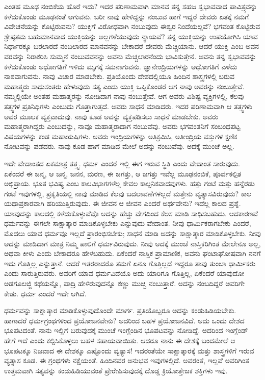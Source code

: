 ಎಂತಹ ಮೂಢ ನಂಬಿಕೆಯ ಹೊರೆ ಇದು? ಇದರ ಪರಿಣಾಮವಾಗಿ ಮಾನವ ತನ್ನ ಸಹಜ ಸ್ವಭಾವವಾದ ಪಾವಿತ್ರ್ಯವನ್ನು ಕಳೆದುಕೊಂಡು ಮೂಢನಂತೆ ಆಗುವನು. ಬರೀ ನಾವು ಹೇಳಿದ್ದನ್ನು ನಂಬುವ ಹಾಗೆ ಇದ್ದರೆ ದೇವರು ಏತಕ್ಕೆ ನಮಗೆ ವಿವೇಚನೆಯನ್ನು ಕೊಟ್ಟಿರುವನು? ಯುಕ್ತಿಗೆ ವಿರೋಧವಾಗಿ ನಂಬುವುದು ಈಶ್ವರ ನಿಂದೆಯಲ್ಲವೆ? ಭಗವಂತ ಕೊಟ್ಟಿರುವ ಶ್ರೇಷ್ಠತಮ ಬಹುಮಾನವಾದ ಯುಕ್ತಿಯನ್ನು ಅಲ್ಲಗಳೆಯುವುದು ನ್ಯಾಯವೆ? ತನ್ನ ಯುಕ್ತಿಯನ್ನು ಉಪಯೋಗಿಸಿ ಯಾವ ನಿರ್ಧಾರಕ್ಕೂ ಬರಲಾರದೆ ನಂಬಲಾರದ ಮಾನವನನ್ನು ಬೇಕಾದರೆ ದೇವರು ಮೆಚ್ಚಿಯಾನು. ಆದರೆ ಯುಕ್ತಿ ಎಂಬ ಅವನ ವರವನ್ನು ನಿರಾಕರಿಸಿ ಸುಮ್ಮನೆ ನಂಬುವವನನ್ನು ಅವನು ಮೆಚ್ಚಲಾರನೆಂದು ಭಾವಿಸುತ್ತೇನೆ. ಅವನು ತನ್ನ ಸ್ವಭಾವವನ್ನು ಕಳೆದುಕೊಂಡು ಅಧೋಗತಿಗೆ ಇಳಿದು ಮೃಗಕ್ಕೆ ಸಮನಾಗುವನು. ಜ್ಞಾನೇಂದ್ರಿಯಗಳನ್ನು ಅಧೋಗತಿಗೆ ಎಳೆದು ನಾಶವಾಗುವನು. ನಾವು ವಿಚಾರ ಮಾಡಬೇಕು. ಪ್ರತಿಯೊಂದು ದೇಶದಲ್ಲಿಯೂ ಹಿಂದಿನ ಶಾಸ್ತ್ರಗಳಲ್ಲಿ ಬರುವ ಮಹಾತ್ಮರು ಸಾಧುಸಂತರು ಹೇಳುವುದು ಸತ್ಯ ಎಂದು ಯುಕ್ತಿ ಒಪ್ಪಿಕೊಂಡರೆ ಆಗ ನಾವು ಅವರನ್ನು ನಂಬುತ್ತೇವೆ. ನಮ್ಮಲ್ಲಿಯೇ ಅಂತಹ ಮಹಾತ್ಮರನ್ನು ನೋಡಿದಾಗ ನಾವು ನಂಬುತ್ತೇವೆ. ಆಗ ಅವರು ವಿಶಿಷ್ಟ ವ್ಯಕ್ತಿಗಳಲ್ಲಿ, ಕೆಲವು ತತ್ತ್ವಗಳ ಪ್ರತಿನಿಧಿಗಳು ಎಂಬುದು ಗೊತ್ತಾಗುತ್ತದೆ. ಅವರು ಸಾಧನೆ ಮಾಡಿದರು. ಇದರ ಪರಿಣಾಮವಾಗಿ ಆ ತತ್ತ್ವಗಳು ಅವರ ಮೂಲಕ ವ್ಯಕ್ತವಾದುವು. ನಾವು ಕೂಡ ಅವನ್ನು ವ್ಯಕ್ತಪಡಿಸಲು ಸಾಧನೆ ಮಾಡಬೇಕು. ಅವರು ಮಹಾತ್ಮರಾಗಿದ್ದರು ಎಂಬುದನ್ನು, ನಾವೂ ಮಹಾತ್ಮರಾದಾಗ ನಂಬುವೆವು. ಅವರು ಭಗವಂತನಿಗೆ ಸಂಬಂಧಪಟ್ಟ ವಿಷಯಗಳನ್ನು ಕಂಡ ಮಹಾಋಷಿಗಳು. ಅವರು ಇಂದ್ರಿಯಗಳನ್ನು ಅತಿಕ್ರಮಿಸಿ, ಅತೀಂದ್ರಿಯ ವಸ್ತುಗಳ ಕ್ಷಣಿಕ ನೋಟವನ್ನು ಪಡೆದರು. ನಾವು ಕೂಡ ಹಾಗೆ ಮಾಡಿದ ಮೇಲೆ ಅದನ್ನು ನಂಬುವೆವು. ಅದಕ್ಕೆ ಮುಂಚೆ ಅಲ್ಲ.

ಇದೇ ವೇದಾಂತದ ಏಕಮಾತ್ರ ತತ್ತ್ವ. ಧರ್ಮ ಎಂದರೆ ಇಲ್ಲಿ ಈಗ ಇರುವ ಸ್ಥಿತಿ ಎಂದು ವೇದಾಂತ ಸಾರುವುದು. ಏಕೆಂದರೆ ಈ ಜನ್ಮ, ಆ ಜನ್ಮ, ಜನನ, ಮರಣ, ಈ ಜಗತ್ತು, ಆ ಜಗತ್ತು ಇವೆಲ್ಲ ಮೂಢನಂಬಿಕೆ, ಪೂರ್ವಕಲ್ಪಿತ ಅಭಿಪ್ರಾಯ. ಭೂತ ಭವಿಷ್ಯ ಎಂಬ ಕಾಲವಿಭಾಗಗಳೆಲ್ಲ ಕೇವಲ ಕಾಲ್ಪನಿಕವಾದವುಗಳು. ಹತ್ತು ಗಂಟೆ ಮತ್ತು ಹನ್ನೆರಡು ಗಂಟೆ ಇವುಗಳಲ್ಲಿ, ಪ್ರಕೃತಿಯಲ್ಲಿ ನಾವು ಮಾಡಿದ ಕೆಲವು ಬದಲಾವಣೆಗಳಲ್ಲದೆ ಮತ್ತೇನು ವ್ಯತ್ಯಾಸವಿರುವುದು? ಕಾಲ ಯಥಾಪ್ರಕಾರವಾಗಿ ಹರಿಯುತ್ತಿರುವುದು. ಈ ಜೀವನ ಆ ಜೀವನ ಎಂದರೆ ಅರ್ಥವೇನು? ಇದೆಲ್ಲ ಕಾಲದ ಪ್ರಶ್ನೆ. ಯಾವುದನ್ನು ಕಾಲದಲ್ಲಿ ಕಳೆದುಕೊಳ್ಳುವೆವೊ ಅದನ್ನು ಹೆಚ್ಚು ವೇಗದಿಂದ ಕೆಲಸ ಮಾಡಿ ಸಾಧಿಸಬಹುದು. ಆದಕಾರಣವೆ ಧರ್ಮವನ್ನು ಈಗಲೇ ಸಾಕ್ಷಾತ್ಕಾರ ಮಾಡಿಕೊಳ್ಳಬೇಕು ಎನ್ನುವುದು ವೇದಾಂತ. ನೀವು ಧಾರ್ಮಿಕರಾಗಬೇಕು ಎಂದರೆ, ಮೊದಲು ಯಾವ ಧರ್ಮವೂ ಇಲ್ಲದೆ ಪ್ರಾರಂಭಿಸಬೇಕು; ಸಾಧನೆ ಮಾಡಿ ಅದನ್ನು ಸಾಕ್ಷಾತ್ಕಾರ ಮಾಡಿಕೊಳ್ಳಬೇಕು. ನೀವು ಅದನ್ನು ಮಾಡಿದಾಗ ಮಾತ್ರ ನಿಮ್ಮ ಪಾಲಿಗೆ ಧರ್ಮವಿರುವುದು. ನೀವು ಅದಕ್ಕೆ ಮುಂಚೆ ನಾಸ್ತಿಕರಿಗಿಂತ ಮೇಲೇನೂ ಅಲ್ಲ, ಅಥವಾ ಕೀಳು ಎಂದು ಬೇಕಾದರೂ ಹೇಳಬಹುದು. ಏಕೆಂದರೆ ನಾಸ್ತಿಕ ಪ್ರಾಮಾಣಿಕ, ಅವನು ಘಂಟಾಘೋಷವಾಗಿ ನನಗೆ ಇದು ಗೊತ್ತಿಲ್ಲ ಎನ್ನುತ್ತಾನೆ. ಆದರೆ ಇತರರಾದರೊ ತಮಗೆ ಏನೂ ಗೊತ್ತಿಲ್ಲದೆ ಇದ್ದರೂ ತಾವು ತುಂಬಾ ಧಾರ್ಮಿಕರು ಎಂದು ಸಾರುತ್ತಿರುವರು. ಅವರಿಗೆ ಯಾವ ಧರ್ಮವಿದೆಯೊ ಅದು ಯಾರಿಗೂ ಗೊತ್ತಿಲ್ಲ, ಏಕೆಂದರೆ ಯಾವುದೋ ಅಡಗೂಲಜ್ಜಿ ಕಥೆಯನ್ನೊ, ಪಾದ್ರಿ ಹೇಳಿರುವುದನ್ನೊ ಕಣ್ಣು ಮುಚ್ಚಿ ನಂಬುತ್ತಾರೆ. ಅದನ್ನು ನಂಬದಿದ್ದರೆ ಅವರಿಗೇ ಕೇಡು. ಧರ್ಮ ಎಂದರೆ ಇದೇ ಆಗಿದೆ.

ಧರ್ಮವನ್ನು ಸಾಕ್ಷಾತ್ಕಾರ ಮಾಡಿಕೊಳ್ಳುವುದೊಂದೇ ಮಾರ್ಗ. ಪ್ರತಿಯೊಬ್ಬರೂ ಅದನ್ನು ಕಂಡುಹಿಡಿಯಬೇಕು. ಹಾಗಾದರೆ ಧರ್ಮಗ್ರಂಥಗಳಿಂದ ಪ್ರಯೋಜನವೇನು? ಅದರಿಂದ ಬಹಳ ಪ್ರಯೋಜನವಿದೆ. ಅದು ಒಂದು ದೇಶದ ಭೂಪಟದಂತೆ. ನಾನು ಇಲ್ಲಿಗೆ ಬರುವುದಕ್ಕೆ ಮುಂಚೆ ಇಂಗ್ಲೆಂಡಿನ ಭೂಪಟವನ್ನು ನೋಡಿದ್ದೆ. ಅದರಿಂದ ಇಂಗ್ಲೆಂಡ್ ಹೇಗೆ ಇದೆ ಎಂದು ಕಲ್ಪಿಸಿಕೊಳ್ಳಲು ಬಹಳ ಸಹಾಯವಾಯಿತು. ಆದರೂ ನಾನು ಈ ದೇಶಕ್ಕೆ ಬಂದಮೇಲೆ ಆ ಭೂಪಟಕ್ಕೂ ನಿಜವಾದ ಈ ದೇಶಕ್ಕೂ ಎಷ್ಟೊಂದು ವ್ಯತ್ಯಾಸ! ಇದರಂತೆಯೇ ಸಾಕ್ಷಾತ್ಕಾರಕ್ಕೆ ಮತ್ತು ಶಾಸ್ತ್ರಗಳಿಗೆ ಇರುವ ವ್ಯತ್ಯಾಸ ಕೂಡ. ಈ ಗ್ರಂಥಗಳು ನಕ್ಷೆಯಂತೆ. ಹಿಂದಿನವರ ಅನುಭವ ಇವುಗಳಲ್ಲಿದೆ. ಅವರಂತೆ, ಇಲ್ಲವೆ ಅವರಿಗಿಂತ ಉತ್ತಮವಾಗಿ ಸತ್ಯವನ್ನು ಕಂಡುಹಿಡಿಯುವಂತೆ ಪ್ರೇರೇಪಿಸುವುದಕ್ಕೆ ದೊಡ್ಡ ಕ್ರಿಯೋತ್ತೇಜಕ ಶಕ್ತಿಗಳು ಇವು.

